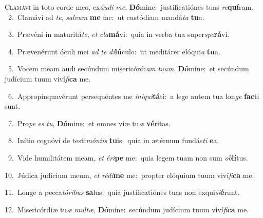 \lettrine{\initial\textcolor{\initialcolor}{C}}{lamávi} in toto corde meo, ex\-\textit{áu}\-\textit{di} \textit{me}\-, \textbf{Dó}\-mine:~\star justificatiónes tuas \textit{re}\-\textbf{quí}ram.\\
{\numbfont\textcolor{\numbcolor}{~2.}}~Clamávi ad \textit{te}\-, \textit{sal}\-\textit{vum} \textbf{me} fac:~\star ut custódiam mandá\textit{ta} \textbf{tu}\-a.\par
{\numbfont\textcolor{\numbcolor}{~3.}}~Prævéni in maturitá\-\textit{te}\-, \textit{et} \textit{cla}\-\textbf{má}vi:~\star quia in verba tua super\-\textit{spe}\-\textbf{rá}vi.\par
{\numbfont\textcolor{\numbcolor}{~4.}}~Prævenérunt óculi mei \textit{ad} \textit{te} \textit{di}\-\textbf{lú}culo:~\star ut meditárer elóqui\textit{a} \textbf{tu}\-a.\par
{\numbfont\textcolor{\numbcolor}{~5.}}~Vocem meam audi secúndum misericórdi\textit{am} \textit{tu}\-\textit{am}, \textbf{Dó}\-mine:~\star et secúndum judícium tuum viví\-\textit{fi}\-\textbf{ca} me.\par
{\numbfont\textcolor{\numbcolor}{~6.}}~Appropinquavérunt persequéntes me \textit{in}\-\textit{i}\textit{qui}\textbf{tá}ti:~\star a lege autem tua lon\textit{ge} \textbf{fac}\-ti sunt.\par
{\numbfont\textcolor{\numbcolor}{~7.}}~Pro\textit{pe} \textit{es} \textit{tu}\-, \textbf{Dó}\-mine:~\star et omnes viæ tu\textit{æ} \textbf{vé}\-ritas.\par
{\numbfont\textcolor{\numbcolor}{~8.}}~Inítio cognóvi de testi\-\textit{mó}\-\textit{ni}\textit{is} \textbf{tu}\-is:~\star quia in ætérnum fundás\textit{ti} \textbf{e}\-a.\par
{\numbfont\textcolor{\numbcolor}{~9.}}~Vide humilitátem meam, \textit{et} \textit{é}\-\textit{ri}\textbf{pe} me:~\star quia legem tuam non sum \textit{ob}\-\textbf{lí}tus.\par
{\numbfont\textcolor{\numbcolor}{10.}}~Júdica judícium meum, \textit{et} \textit{réd}\-\textit{i}\textbf{me} me:~\star propter elóquium tuum viví\-\textit{fi}\-\textbf{ca} me.\par
{\numbfont\textcolor{\numbcolor}{11.}}~Longe a pecca\-\textit{tó}\-\textit{ri}\textit{bus} \textbf{sa}\-lus:~\star quia justificatiónes tuas non exqui\-\textit{si}\-\textbf{é}runt.\par
{\numbfont\textcolor{\numbcolor}{12.}}~Misericórdiæ tu\textit{æ} \textit{mul}\-\textit{tæ}, \textbf{Dó}\-mine:~\star secúndum judícium tuum viví\-\textit{fi}\-\textbf{ca} me.\par
